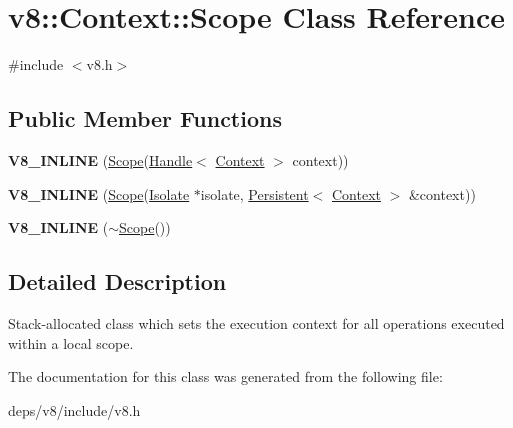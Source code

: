 \hypertarget{classv8_1_1_context_1_1_scope}{}\section{v8\+:\+:Context\+:\+:Scope Class Reference}
\label{classv8_1_1_context_1_1_scope}


{\ttfamily \#include $<$v8.\+h$>$}

\subsection*{Public Member Functions}
\begin{DoxyCompactItemize}
\item 
\hypertarget{classv8_1_1_context_1_1_scope_a193358558d5c1f62b6900b9d8de6807e}{}{\bfseries V8\+\_\+\+I\+N\+L\+I\+N\+E} (\hyperlink{classv8_1_1_context_1_1_scope}{Scope}(\hyperlink{classv8_1_1_handle}{Handle}$<$ \hyperlink{classv8_1_1_context}{Context} $>$ context))\label{classv8_1_1_context_1_1_scope_a193358558d5c1f62b6900b9d8de6807e}

\item 
\hypertarget{classv8_1_1_context_1_1_scope_aa1f9dad2490075b07fa71621b5112bf8}{}{\bfseries V8\+\_\+\+I\+N\+L\+I\+N\+E} (\hyperlink{classv8_1_1_context_1_1_scope}{Scope}(\hyperlink{classv8_1_1_isolate}{Isolate} $\ast$isolate, \hyperlink{classv8_1_1_persistent}{Persistent}$<$ \hyperlink{classv8_1_1_context}{Context} $>$ \&context))\label{classv8_1_1_context_1_1_scope_aa1f9dad2490075b07fa71621b5112bf8}

\item 
\hypertarget{classv8_1_1_context_1_1_scope_ac2a1c73e596c9f2f9921bd9d629ee9d2}{}{\bfseries V8\+\_\+\+I\+N\+L\+I\+N\+E} ($\sim$\hyperlink{classv8_1_1_context_1_1_scope}{Scope}())\label{classv8_1_1_context_1_1_scope_ac2a1c73e596c9f2f9921bd9d629ee9d2}

\end{DoxyCompactItemize}


\subsection{Detailed Description}
Stack-\/allocated class which sets the execution context for all operations executed within a local scope. 

The documentation for this class was generated from the following file\+:\begin{DoxyCompactItemize}
\item 
deps/v8/include/v8.\+h\end{DoxyCompactItemize}
